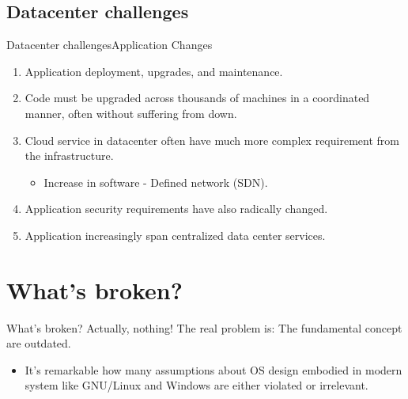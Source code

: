\documentclass[10pt]{beamer}
\begin{document}
\subsection{Datacenter challenges}
\begin{frame}{Datacenter challenges}{Application Changes}
  \begin{enumerate}
    \item Application deployment, upgrades, and maintenance.
    \item Code must be upgraded across thousands of machines in a coordinated
          manner, often without suffering from down.
    \item Cloud service in datacenter often have much more complex requirement
          from the infrastructure.
     \begin{itemize}
      \item Increase in software - Defined network (SDN).
     \end{itemize}
    \item Application security requirements have also radically changed.
    \item Application increasingly span centralized data center services.
  \end{enumerate}
\end{frame}


\section{What's broken?}
\begin{frame}{What's broken?}
Actually, nothing! The real problem is: The fundamental concept are outdated.
  \begin{itemize}
    \item It's remarkable how many assumptions about OS design embodied in
      modern system like GNU/Linux and Windows are either violated or
      irrelevant.
  \end{itemize}
\end{frame}

\end{document}
